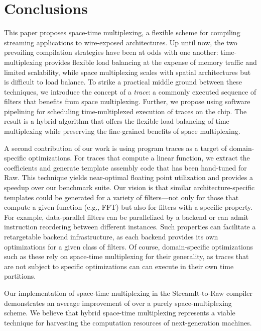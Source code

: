 \section{Conclusions}
\label{sec:conclusion}

This paper proposes space-time multiplexing, a flexible scheme for
compiling streaming applications to wire-exposed architectures.  Up
until now, the two prevailing compilation strategies have been at odds
with one another: time-multiplexing provides flexible load balancing
at the expense of memory traffic and limited scalability, while space
multiplexing scales with spatial architectures but is difficult to
load balance.  To strike a practical middle ground between these
techniques, we introduce the concept of a {\it trace}: a commonly
executed sequence of filters that benefits from space multiplexing.
Further, we propose using software pipelining for scheduling
time-multiplexed execution of traces on the chip.  The result is a
hybrid algorithm that offers the flexible load balancing of time
multiplexing while preserving the fine-grained benefits of space
multiplexing.

A second contribution of our work is using program traces as a target
of domain-specific optimizations.  For traces that compute a linear
function, we extract the coefficients and generate template assembly
code that has been hand-tuned for Raw.  This technique yields
near-optimal floating point utilization and provides a 
speedup over our benchmark suite.  Our vision is that similar
architecture-specific templates could be generated for a variety of
filters---not only for those that compute a given function (e.g., FFT)
but also for filters with a specific property.  For example,
data-parallel filters can be parallelized by a backend or can admit
instruction reordering between different instances.  Such properties
can facilitate a retargetable backend infrastructure, as each backend
provides its own optimizations for a given class of filters.  Of
course, domain-specific optimizations such as these rely on space-time
multiplexing for their generality, as traces that are not subject to
specific optimizations can can execute in their own time partitions.

Our implementation of space-time multiplexing in the StreamIt-to-Raw
compiler demonstrates an average improvement of  over a
purely space-multiplexing scheme.  We believe that hybrid space-time
multiplexing represents a viable technique for harvesting the
computation resources of next-generation machines.
